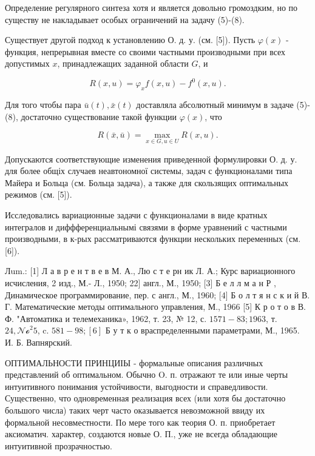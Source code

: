 \documentclass[10pt]{article}
\begin{document}
Определение регулярного синтеза хотя и является довольно громоздким, но по существу не накладывает особых ограничений на задачу (5)-(8).



Существует другой подход к установлению О. д. у. (см. [5]). Пусть $\varphi(x)$ - функция, непрерывная вместе со своими частными производными при всех допустимых $x$, принадлежащих заданной области $G$, и



\[

R(x, u)=\varphi_{x} f(x, u)-f^{0}(x, u) .

\]



Для того чтобы пара $\bar{u}(t), \bar{x}(t)$ доставляла абсолютный минимум в задаче (5)-(8), достаточно существование такой функции $\varphi(x)$, что



\[

R(\bar{x}, \bar{u})=\max _{x \in G, u \in U} R(x, u) .

\]



Допускаются соответствующие изменения приведенной формулировки О. д. у. для более общіх случаев неавтономної системы, задач с функционалами типа Майера и Больца (см. Больца задача), а также для скользящих оптимальных режимов (см. [5]).



Исследовались вариационные задачи с функционалами в виде кратных интегралов и диффференциальнымі связями в форме уравнений с частными производными, в к-рых рассматриваются функции нескольких переменных (см. [6]).



Лum.: [1] Л а в р е н т в е в М. А., Лю с т е рн ик Л. А.; Курс вариационного исчисления, 2 изд., М.- Л., 1950; 22$]$ англ., М., 1950; [3] Б е л л м а н Р , Динамическое программирование, пер. с англ., М., 1960; [4] Б о л т я н с к и й В. Г. Математические методы оптимального управления, М., 1966 [5] К р о т о в В. Ф. "Автоматика и телемеханика», 1962, т. 23, № 12, с. $1571-83 ; 1963$, т. $24, \mathcal{N o}^{2} 5$, c. $581-98 ;[6]$ Б у т к о враспределенными параметрами, М., 1965. И. Б. Вапнярский.



ОПТИМАЛЬНОСТИ ПРИНЦИІЫ - формальные описания различных представлений об оптимальном. Обычно O. п. отражают те или иные черты интуитивного понимания устойчивости, выгодности и справедливости. Существенно, что одновременная реализация всех (или хотя бы достаточно большого числа) таких черт часто оказывается невозможной ввиду их формальной несовместности. По мере того как теория О. п. приобретает аксиоматич. характер, создаются новые О. П., уже не всегда обладающие интуитивной прозрачностью.
\end{document}
